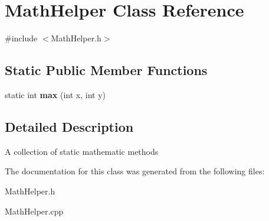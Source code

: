 \hypertarget{class_math_helper}{}\section{Math\+Helper Class Reference}
\label{class_math_helper}


{\ttfamily \#include $<$Math\+Helper.\+h$>$}

\subsection*{Static Public Member Functions}
\begin{DoxyCompactItemize}
\item 
\mbox{\label{class_math_helper_aae828a408f21c694111717cf85195fa6}} 
static int {\bfseries max} (int x, int y)
\end{DoxyCompactItemize}


\subsection{Detailed Description}
A collection of static mathematic methods 

The documentation for this class was generated from the following files\+:\begin{DoxyCompactItemize}
\item 
Math\+Helper.\+h\item 
Math\+Helper.\+cpp\end{DoxyCompactItemize}
